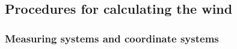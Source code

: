 \documentclass[12pt,twoside,english]{article}\usepackage[]{graphicx}\usepackage[]{color}
\begin{document}

\subsection{Procedures for calculating the wind\label{sub:General-comments}}

\subsubsection{Measuring systems and coordinate systems}
\end{document}
